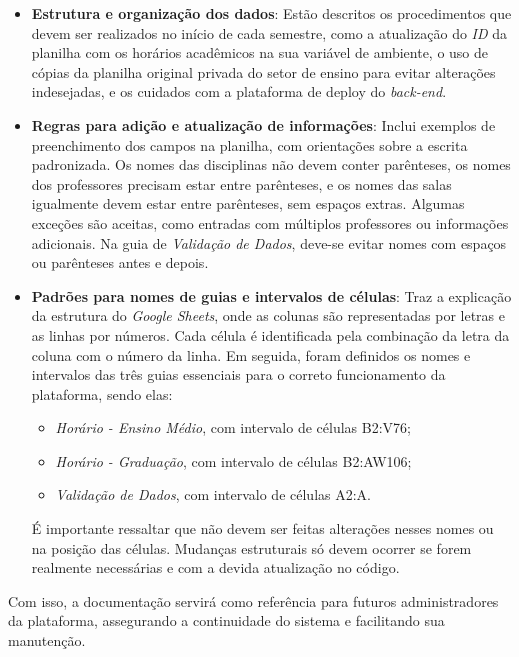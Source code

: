 \begin{itemize}
    \item \textbf{Estrutura e organização dos dados}: Estão descritos os procedimentos que devem ser realizados no início de cada semestre, como a atualização do \textit{ID} da planilha com os horários acadêmicos na sua variável de ambiente, o uso de cópias da planilha original privada do setor de ensino para evitar alterações indesejadas, e os cuidados com a plataforma de deploy do \textit{back-end}.
    \item \textbf{Regras para adição e atualização de informações}: Inclui exemplos de preenchimento dos campos na planilha, com orientações sobre a escrita padronizada. Os nomes das disciplinas não devem conter parênteses, os nomes dos professores precisam estar entre parênteses, e os nomes das salas igualmente devem estar entre parênteses, sem espaços extras. Algumas exceções são aceitas, como entradas com múltiplos professores ou informações adicionais. Na guia de \textit{Validação de Dados}, deve-se evitar nomes com espaços ou parênteses antes e depois.
    \item \textbf{Padrões para nomes de guias e intervalos de células}: Traz a explicação da estrutura do \textit{Google Sheets}, onde as colunas são representadas por letras e as linhas por números. Cada célula é identificada pela combinação da letra da coluna com o número da linha. Em seguida, foram definidos os nomes e intervalos das três guias essenciais para o correto funcionamento da plataforma, sendo elas:
    \begin{itemize}
        \item \textit{Horário - Ensino Médio}, com intervalo de células B2:V76;
        \item \textit{Horário - Graduação}, com intervalo de células B2:AW106;
        \item \textit{Validação de Dados}, com intervalo de células A2:A.
    \end{itemize}
    É importante ressaltar que não devem ser feitas alterações nesses nomes ou na posição das células. Mudanças estruturais só devem ocorrer se forem realmente necessárias e com a devida atualização no código.
\end{itemize}

Com isso, a documentação servirá como referência para futuros administradores da plataforma, assegurando a continuidade do sistema e facilitando sua manutenção.